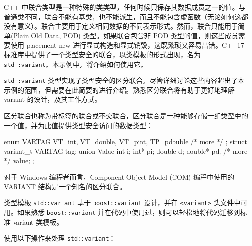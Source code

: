 C++ 中联合类型是一种特殊的类类型，任何时候只保存其数据成员之一的值。与普通类不同，联合不能有基类，也不能派生，而且不能包含虚函数（无论如何这都没有意义）。联合主要用于定义相同数据的不同表示形式。然而，联合只能用于简单(Plain Old Data, POD) 类型。如果联合包含非 POD 类型的值，则这些成员需要使用 placement new 进行显式构造和显式销毁，这既繁琐又容易出错。C++17标准库中提供了一个类型安全的联合，以类模板的形式出现，名为 \verb|std::variant|。本示例中，将介绍如何使用它。


\verb|std::variant| 类型实现了类型安全的区分联合。尽管详细讨论这些内容超出了本示例的范围，但需要在此简要的进行介绍。熟悉区分联合将有助于更好地理解 variant 的设计，及其工作方式。

区分联合也称为带标签的联合或不交联合，区分联合是一种能够存储一组类型中的一个值，并为此值提供类型安全访问的数据类型：

\begin{cpp}
enum VARTAG {VT_int, VT_double, VT_pint, TP_pdouble /* more */ };
struct variant_t
{
    VARTAG tag;
    union Value
    {
        int     i;
        int*    pi;
        double  d;
        double* pd;
        /* more */
    } value;
};
\end{cpp}

对于 Windows 编程者而言，Component Object Model (COM) 编程中使用的 VARIANT 结构是一个知名的区分联合。

类型模板 \verb|std::variant| 基于 \verb|boost::variant| 设计，并在 \verb|<variant>| 头文件中可用。如果熟悉 \verb|boost::variant| 并在代码中使用过，则可以轻松地将代码迁移到标准 variant 类模板。


使用以下操作来处理 \verb|std::variant|：

